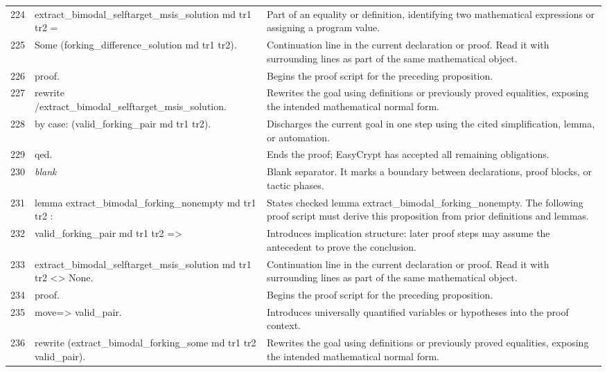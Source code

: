 \documentclass[10pt]{article}
\begin{document}
\begin{longtable}{r L{0.53\textwidth} L{0.37\textwidth}}
224 & {\ttfamily\scriptsize   extract\_bimodal\_selftarget\_msis\_solution md tr1 tr2 =} & Part of an equality or definition, identifying two mathematical expressions or assigning a program value. \\
225 & {\ttfamily\scriptsize     Some (forking\_difference\_solution md tr1 tr2).} & Continuation line in the current declaration or proof.  Read it with surrounding lines as part of the same mathematical object. \\
226 & {\ttfamily\scriptsize proof.} & Begins the proof script for the preceding proposition. \\
227 & {\ttfamily\scriptsize rewrite /extract\_bimodal\_selftarget\_msis\_solution.} & Rewrites the goal using definitions or previously proved equalities, exposing the intended mathematical normal form. \\
228 & {\ttfamily\scriptsize by case: (valid\_forking\_pair md tr1 tr2).} & Discharges the current goal in one step using the cited simplification, lemma, or automation. \\
229 & {\ttfamily\scriptsize qed.} & Ends the proof; EasyCrypt has accepted all remaining obligations. \\
230 & {\ttfamily\scriptsize \emph{blank}} & Blank separator.  It marks a boundary between declarations, proof blocks, or tactic phases. \\
231 & {\ttfamily\scriptsize lemma extract\_bimodal\_forking\_nonempty md tr1 tr2 :} & States checked lemma extract\_bimodal\_forking\_nonempty.  The following proof script must derive this proposition from prior definitions and lemmas. \\
232 & {\ttfamily\scriptsize   valid\_forking\_pair md tr1 tr2 =>} & Introduces implication structure: later proof steps may assume the antecedent to prove the conclusion. \\
233 & {\ttfamily\scriptsize   extract\_bimodal\_selftarget\_msis\_solution md tr1 tr2 <> None.} & Continuation line in the current declaration or proof.  Read it with surrounding lines as part of the same mathematical object. \\
234 & {\ttfamily\scriptsize proof.} & Begins the proof script for the preceding proposition. \\
235 & {\ttfamily\scriptsize move=> valid\_pair.} & Introduces universally quantified variables or hypotheses into the proof context. \\
236 & {\ttfamily\scriptsize rewrite (extract\_bimodal\_forking\_some md tr1 tr2 valid\_pair).} & Rewrites the goal using definitions or previously proved equalities, exposing the intended mathematical normal form. \\

\end{longtable}
\end{document}
